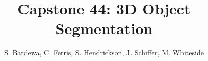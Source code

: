 \documentclass[journal]{IEEEtran}
\begin{document}
%
\title{Capstone 44: 3D Object Segmentation}
%
%
%

\author{S. Bardewa, C. Ferris, S. Hendrickson, J. Schiffer, M. Whiteside
}

% 
%



% 




\end{document}
